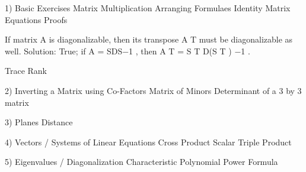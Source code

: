 1) Basic Exercises
	Matrix Multiplication
	Arranging Formulaes
	Identity Matrix Equations
	Proofs


If matrix A is diagonalizable, then its transpose A
T must be diagonalizable as well.
Solution: True; if A = SDS−1
, then A
T = S
T D(S
T
)
−1
.

Trace
Rank


2) Inverting a Matrix using Co-Factors
	Matrix of Minors
	Determinant of a 3 by 3 matrix

3) Planes
	Distance

4) Vectors / Systems of Linear Equations
	Cross Product
	Scalar Triple Product


5) Eigenvalues / Diagonalization
	Characteristic Polynomial
	Power Formula

